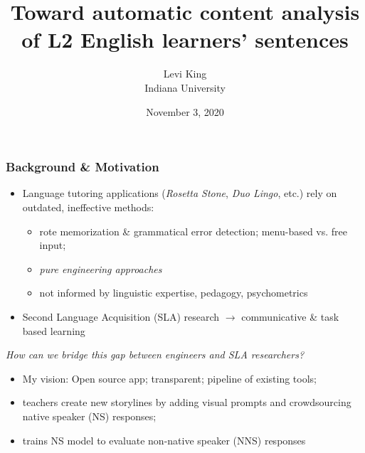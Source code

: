 \documentclass[xcolor={dvipsnames}]{beamer}
\title{Toward automatic content analysis of L2 English learners' sentences}
\author[Levi King]{Levi King\\
Indiana University  }
\date{November 3, 2020}
\begin{document}
\maketitle
\begin{frame}
\frametitle{Background \& Motivation}
\begin{itemize}
\pause
\item Language tutoring applications (\textit{Rosetta Stone}, \textit{Duo Lingo}, etc.) rely on outdated, ineffective methods:
\begin{itemize}
\pause
\item rote memorization \& grammatical error detection; menu-based vs. free input;
\pause
\item \textit{pure engineering approaches}
\pause
\item not informed by linguistic expertise, pedagogy, psychometrics
\end{itemize}
\pause
\item Second Language Acquisition (SLA) research $\rightarrow$ communicative \& task based learning
\end{itemize}

\small
\pause
\textit{How can we bridge this gap between engineers and SLA researchers?}

\begin{itemize}
\pause
\item My vision: \pause Open source app; transparent; pipeline of existing tools;
\pause
\item teachers create new storylines by adding visual prompts and crowdsourcing native speaker (NS) responses;
\pause
\item trains NS model to evaluate non-native speaker (NNS) responses
\end{itemize}
\end{frame}
\end{document}
